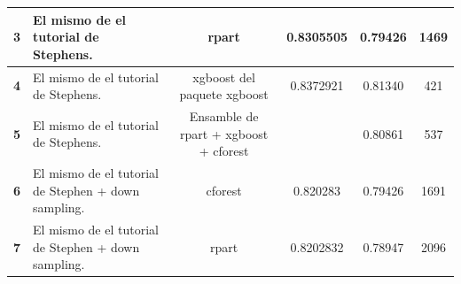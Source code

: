 \documentclass[10pt,a4paper]{article}
\begin{document}
\begin{landscape}
\begin{table}[H]
\begin{tabular}{|c|l|c|c|c|c|}
\textbf{3}                        & El mismo de el tutorial de Stephens.                                                                                                                                                                                                                                        & rpart                                  & 0.8305505                                                        & 0.79426                                                         & 1469             \\ \hline
\textbf{4}                        & El mismo de el tutorial de Stephens.                                                                                                                                                                                                                                        & xgboost del paquete xgboost            & 0.8372921                                                        & 0.81340                                                         & 421              \\ \hline
\textbf{5}                        & El mismo de el tutorial de Stephens.                                                                                                                                                                                                                                        & Ensamble de rpart + xgboost + cforest  &                                                                  & 0.80861                                                         & 537              \\ \hline
\textbf{6}                        & El mismo de el tutorial de Stephen + down sampling.                                                                                                                                                                                                                         & cforest                                & 0.820283                                                         & 0.79426                                                         & 1691             \\ \hline
\textbf{7}                        & El mismo de el tutorial de Stephen + down sampling.                                                                                                                                                                                                                         & rpart                                  & 0.8202832                                                        & 0.78947                                                         & 2096             \\ \hline

\end{tabular}
\end{table}
\end{landscape}
\end{document}
